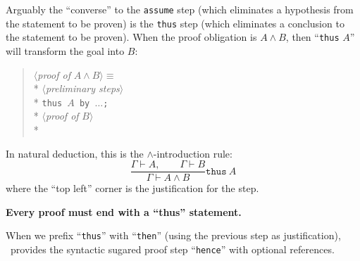 \begin{node}[Thus]\label{mizar-0009}%
Arguably the ``converse'' to the \texttt{assume} step (which eliminates
a hypothesis from the statement to be proven) is the \texttt{thus} step
(which eliminates a conclusion to the statement to be proven). When the
proof obligation is $A\land B$, then ``\texttt{thus} $A$'' will
transform the goal into $B$:

\begin{verse}
$\langle$\emph{proof of \/}$A\wedge B\rangle \equiv$\\*
\qquad $\langle$\emph{preliminary steps\/}$\rangle$\\*
\qquad \texttt{thus }$A$\texttt{ by }$\ldots$\texttt{;}\\*
\qquad $\langle$\emph{proof of \/}$B\rangle$\\*
\end{verse}
In natural deduction, this is the $\land$-introduction rule:
\[\frac{\Gamma\vdash A,\qquad\Gamma\vdash B}{\Gamma\vdash A\land B}\mathtt{thus}~A\]
where the ``top left'' corner is the justification for the step.

\textbf{Every proof must end with a ``thus'' statement.}

\begin{node}[Hence = then + thus]\label{mizar-000E}%
When we prefix ``\texttt{thus}'' with ``\texttt{then}'' (using the
previous step as justification), \Mizar\ provides the syntactic sugared
proof step ``\texttt{hence}'' with optional references.
\end{node}
\end{node}

